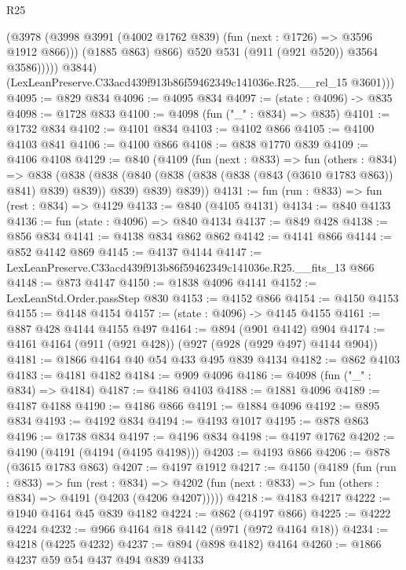 \begin{lexlean}{R25}
\begin{coremodule}
                      (@3978
                        (@3998 @3991 (@4002 @1762 @839) (fun (next : @1726) => @3596 @1912 @866)))
                      (@1885 @863)
                      @866)
                    @520
                    @531
                    (@911 (@921 @520))
                    @3564
                    @3586)))))
          @3844)
        (LexLeanPreserve.C33acd439f913b86f59462349c141036e.R25.__rel_15 @3601)))
@4095 := @829 @834
@4096 := @4095 @834
@4097 := (state : @4096) -> @835
@4098 := @1728 @833
@4100 := @4098 (fun ("_" : @834) => @835)
@4101 := @1732 @834
@4102 := @4101 @834
@4103 := @4102 @866
@4105 := @4100 @4103 @841
@4106 := @4100 @866
@4108 := @838 @1770 @839
@4109 := @4106 @4108
@4129 := @840
    (@4109
      (fun (next : @833) =>
      fun (others : @834) =>
      @838
        (@838 (@838 (@840 (@838 (@838 (@838 (@843 (@3610 @1783 @863)) @841) @839) @839)) @839) @839)
        @839))
@4131 := fun (run : @833) => fun (rest : @834) => @4129
@4133 := @840 (@4105 @4131)
@4134 := @840 @4133
@4136 := fun (state : @4096) => @840 @4134
@4137 := @849 @428
@4138 := @856 @834
@4141 := @4138 @834 @862 @862
@4142 := @4141 @866
@4144 := @852 @4142 @869
@4145 := @4137 @4144
@4147 := LexLeanPreserve.C33acd439f913b86f59462349c141036e.R25.__fits_13 @866
@4148 := @873 @4147
@4150 := @1838 @4096 @4141
@4152 := LexLeanStd.Order.passStep @830
@4153 := @4152 @866
@4154 := @4150 @4153
@4155 := @4148 @4154
@4157 := (state : @4096) -> @4145 @4155
@4161 := @887 @428 @4144 @4155 @497
@4164 := @894 (@901 @4142) @904
@4174 := @4161 @4164 (@911 (@921 @428)) (@927 (@928 (@929 @497) @4144 @904))
@4181 := @1866 @4164 @40 @54 @433 @495 @839 @4134
@4182 := @862 @4103
@4183 := @4181 @4182
@4184 := @909 @4096
@4186 := @4098 (fun ("_" : @834) => @4184)
@4187 := @4186 @4103
@4188 := @1881 @4096
@4189 := @4187 @4188
@4190 := @4186 @866
@4191 := @1884 @4096
@4192 := @895 @834
@4193 := @4192 @834
@4194 := @4193 @1017
@4195 := @878 @863
@4196 := @1738 @834
@4197 := @4196 @834
@4198 := @4197 @1762
@4202 := @4190 (@4191 (@4194 (@4195 @4198)))
@4203 := @4193 @866
@4206 := @878 (@3615 @1783 @863)
@4207 := @4197 @1912
@4217 := @4150
    (@4189
      (fun (run : @833) =>
      fun (rest : @834) =>
      @4202 (fun (next : @833) => fun (others : @834) => @4191 (@4203 (@4206 @4207)))))
@4218 := @4183 @4217
@4222 := @1940 @4164 @45 @839 @4182
@4224 := @862 (@4197 @866)
@4225 := @4222 @4224
@4232 := @966 @4164 @18 @4142 (@971 (@972 @4164 @18))
@4234 := @4218 (@4225 @4232)
@4237 := @894 (@898 @4182) @4164
@4260 := @1866
    @4237
    @59
    @54
    @437
    @494
    @839
    @4133

\end{coremodule}
\end{lexlean}
